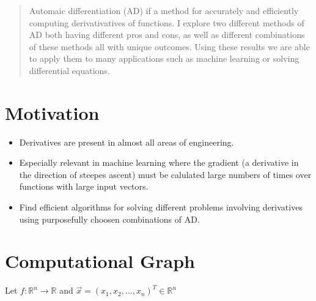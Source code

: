 \documentclass[a0,landscape]{a0poster}
\begin{document}
\vspace{1cm} %


\begin{multicols}{4} %


\begin{abstract}
    Automaic differentiation (AD) if a method for accurately and efficiently
    computing derivativatives of functions. I explore two different methods
    of AD both having different pros and cons, as well as different combinations
    of these methods all with unique outcomes. Using these results we are able to
    apply them to many applications such as machine learning or solving differential
    equations.
\end{abstract}


\section*{Motivation}
\begin{itemize}[noitemsep]
\item Derivatives are present in almost all areas of engineering.
\item Especially relevant in machine learning where the gradient (a derivative
    in the direction of steepes ascent) must be calulated large numbers of times
    over functions with large input vectors.
\item Find efficient algorithms for solving different problems involving derivatives
    using purposefully choosen combinations of AD.
\end{itemize}
    \vspace{-1cm}
\section*{Computational Graph}
    Let $f:\mathbb{R}^n\rightarrow\mathbb{R}$ and $\vec{x}=(x_1,x_2,\dots,x_n)^T\in\mathbb{R}^n$


\end{multicols}
\end{document}

